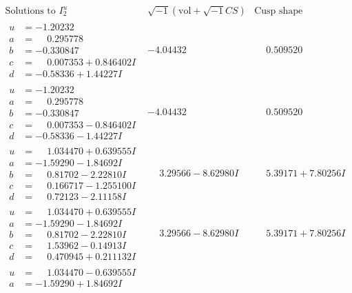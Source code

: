 \documentclass[1p]{elsarticle_modified}
\theoremstyle{definition}
\newcommand{\I}{\sqrt{-1}}
\begin{document}
$$\begin{array}{c|c|c}
\text{Solutions to }I^u_{2}& \I (\text{vol} + \sqrt{-1}CS) & \text{Cusp shape}\\
 \hline 
\begin{aligned}
u &= -1.20232\phantom{ +0.000000I} \\
a &= \phantom{-}0.295778\phantom{ +0.000000I} \\
b &= -0.330847\phantom{ +0.000000I} \\
c &= \phantom{-}0.007353 + 0.846402 I \\
d &= -0.58336 + 1.44227 I\end{aligned}
 & -4.04432\phantom{ +0.000000I} & \phantom{-}0.509520\phantom{ +0.000000I} \\ \hline\begin{aligned}
u &= -1.20232\phantom{ +0.000000I} \\
a &= \phantom{-}0.295778\phantom{ +0.000000I} \\
b &= -0.330847\phantom{ +0.000000I} \\
c &= \phantom{-}0.007353 - 0.846402 I \\
d &= -0.58336 - 1.44227 I\end{aligned}
 & -4.04432\phantom{ +0.000000I} & \phantom{-}0.509520\phantom{ +0.000000I} \\ \hline\begin{aligned}
u &= \phantom{-}1.034470 + 0.639555 I \\
a &= -1.59290 - 1.84692 I \\
b &= \phantom{-}0.81702 - 2.22810 I \\
c &= \phantom{-}0.166717 - 1.255100 I \\
d &= \phantom{-}0.72123 - 2.11158 I\end{aligned}
 & \phantom{-}3.29566 - 8.62980 I & \phantom{-}5.39171 + 7.80256 I \\ \hline\begin{aligned}
u &= \phantom{-}1.034470 + 0.639555 I \\
a &= -1.59290 - 1.84692 I \\
b &= \phantom{-}0.81702 - 2.22810 I \\
c &= \phantom{-}1.53962 - 0.14913 I \\
d &= \phantom{-}0.470945 + 0.211132 I\end{aligned}
 & \phantom{-}3.29566 - 8.62980 I & \phantom{-}5.39171 + 7.80256 I \\ \hline\begin{aligned}
u &= \phantom{-}1.034470 - 0.639555 I \\
a &= -1.59290 + 1.84692 I \\

\end{aligned}
\end{array}$$
\end{document}
